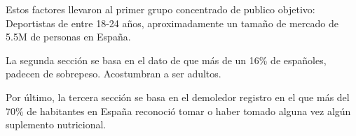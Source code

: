 \documentclass[11pt,a4paper]{report}
\begin{document}
\begin{figure}[htbp]
  \centering
  \begin{minipage}{0.48\textwidth}
    \centering
    \label{fig:pie-chart-1-mini}
  \end{minipage}
  \hfill
  \begin{minipage}{0.48\textwidth}
    \centering
    \label{fig:pie-chart-2-mini}
  \end{minipage}
\end{figure}


Estos factores llevaron al primer grupo concentrado de publico objetivo: Deportistas de entre 18-24 años, aproximadamente un tamaño de mercado de 5.5M de personas en España.

La segunda sección se basa en el dato de que más de un 16\% de españoles,  padecen de sobrepeso. Acostumbran a ser adultos. 


Por último, la tercera sección se basa en el demoledor registro en el que más del 70\% de habitantes en España reconoció tomar o haber tomado alguna vez algún suplemento nutricional.


\end{document}
